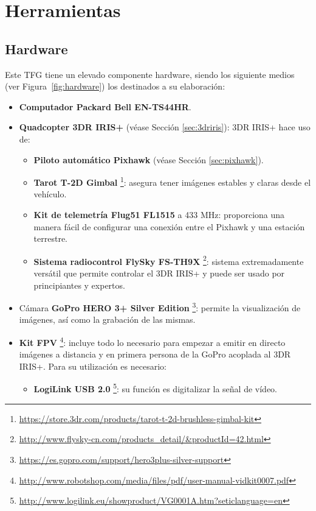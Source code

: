 \section{Herramientas}
\label{sec:herramientastfg}

\subsection{Hardware}
\label{sec:hardware}

Este \acs{TFG} tiene un elevado componente hardware, siendo los siguiente medios (ver Figura~\ref{fig:hardware}) los destinados a su elaboración:

\begin{itemize}
\item \textbf{Computador Packard Bell EN-TS44HR}.
\item \textbf{Quadcopter 3DR IRIS+} (véase Sección \ref{sec:3driris}): 3DR IRIS+ hace uso de:
	\begin{itemize}
	\item \textbf{Piloto automático Pixhawk} (véase Sección \ref{sec:pixhawk}).
	\item \textbf{Tarot T-2D Gimbal} \footnote{\url{https://store.3dr.com/products/tarot-t-2d-brushless-gimbal-kit}}: asegura tener imágenes estables y claras desde el vehículo.
	\item \textbf{Kit de telemetría Flug51 FL1515} a 433 MHz: proporciona una manera fácil de configurar una conexión entre el Pixhawk y una estación terrestre.
	\item \textbf{Sistema radiocontrol FlySky FS-TH9X} \footnote{\url{http://www.flysky-cn.com/products_detail/&productId=42.html}}: sistema extremadamente versátil que permite controlar el 3DR IRIS+ y puede ser usado por principiantes y expertos.
	\end{itemize}
\item Cámara \textbf{GoPro HERO 3+ Silver Edition} \footnote{\url{https://es.gopro.com/support/hero3plus-silver-support}}: permite la visualización de imágenes, así como la grabación de las mismas.
\item \textbf{Kit \acs{FPV}} \footnote{\url{http://www.robotshop.com/media/files/pdf/user-manual-vidkit0007.pdf}}: incluye todo lo necesario para empezar a emitir en directo imágenes a distancia y en primera persona de la GoPro acoplada al 3DR IRIS+. Para su utilización es necesario:
	\begin{itemize}
	\item \textbf{LogiLink USB 2.0} \footnote{\url{http://www.logilink.eu/showproduct/VG0001A.htm?seticlanguage=en}}: su función es digitalizar la señal de vídeo. \\
	\end{itemize}
\end{itemize}

